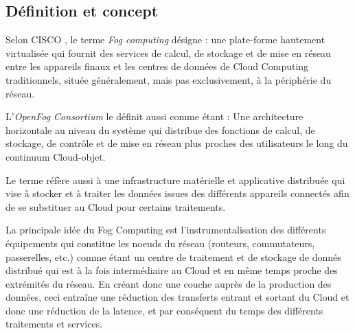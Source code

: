 \subsection{Définition et concept}
Selon CISCO \cite{bonomi2012}, le terme \emph{Fog computing} désigne : \og{}une plate-forme hautement virtualisée qui fournit des services de calcul, de stockage et de mise en réseau entre les appareils finaux et les centres de données de Cloud Computing traditionnels, située généralement, mais pas exclusivement, à la périphérie du réseau\fg{}.\par
L'\emph{OpenFog Consortium} \cite{OpenFog2017} le définit aussi comme étant : \og{} Une architecture horizontale au niveau du système qui distribue des fonctions de calcul, de stockage, de contrôle et de mise en réseau plus proches des utilisateurs le long du continuum Cloud-objet\fg{}.\par
Le terme réfère aussi à une infrastructure matérielle et applicative distribuée qui vise à stocker et à traiter les données issues des différents appareils connectés afin de se substituer au Cloud pour certains traitements.\par
La principale idée du Fog Computing est l'instrumentalisation des différents équipements qui constitue les noeuds du réseau (routeurs, commutateurs, passerelles, etc.) comme étant un centre de traitement et de stockage de donnés distribué qui est à la fois intermédiaire au Cloud et en même temps proche des extrémités du réseau.
En créant donc une couche auprès de la production des données, ceci entraîne une réduction des transferts entrant et sortant du Cloud et donc une réduction de la latence, et par conséquent du temps des différents traitements et services.

